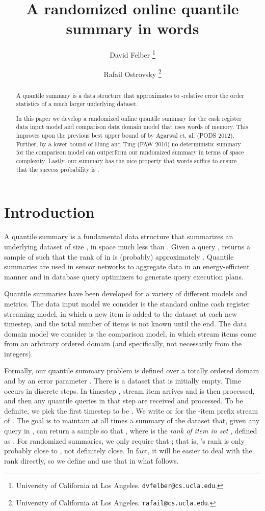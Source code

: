 \documentclass{article}
\title{A randomized online quantile summary in  words}
\author{
David Felber
\thanks{University of California at Los Angeles. \texttt{dvfelber@cs.ucla.edu}.}
\and
Rafail Ostrovsky
\thanks{University of California at Los Angeles. \texttt{rafail@cs.ucla.edu}.}
}
\date{}
\theoremstyle{plain}
\begin{document}
\maketitle

\begin{abstract}

  A quantile summary is a data structure that approximates to -relative
  error the order statistics of a much larger underlying dataset.

  In this paper we develop a randomized online quantile summary for the cash
  register data input model and comparison data domain model that uses
   words of memory. This improves upon
  the previous best upper bound of 
  by Agarwal et. al. (PODS 2012). Further, by a lower bound of Hung and Ting
  (FAW 2010) no deterministic summary for the comparison model can outperform
  our randomized summary in terms of space complexity. Lastly, our summary has
  the nice property that  words suffice
  to ensure that the success probability is .

\end{abstract}
 
\section{Introduction}
\label{sec:introduction}

A quantile summary  is a fundamental data structure that summarizes an
underlying dataset  of size , in space much less than . Given a query
,  returns a sample  of  such that the rank of  in  is
(probably) approximately . Quantile summaries are used in sensor
networks to aggregate data in an energy-efficient manner and in database query
optimizers to generate query execution plans.

Quantile summaries have been developed for a variety of different models and
metrics. The data input model we consider is the standard online cash register
streaming model, in which a new item is added to the dataset at each new
timestep, and the total number of items is not known until the end. The data
domain model we consider is the comparison model, in which stream items come
from an arbitrary ordered domain (and specifically, not necessarily from the
integers).

Formally, our quantile summary problem is defined over a totally ordered domain
 and by an error parameter . There is a dataset  that is
initially empty. Time occurs in discrete steps. In timestep , stream item
 arrives and is then processed, and then any quantile queries  in
that step are received and processed. To be definite, we pick the first timestep
to be . We write  or  for the -item prefix stream  of . The goal is to maintain at all times  a summary  of the
dataset  that, given any query  in , can return a sample  so that , where
   is the \emph{rank of item  in set }, defined as
  . For randomized summaries, we only require
  that ; that is, 's rank is only probably close to , not
  definitely close. In fact, it will be easier to deal with the rank directly,
  so we define  and use that in what follows.
\end{document}
